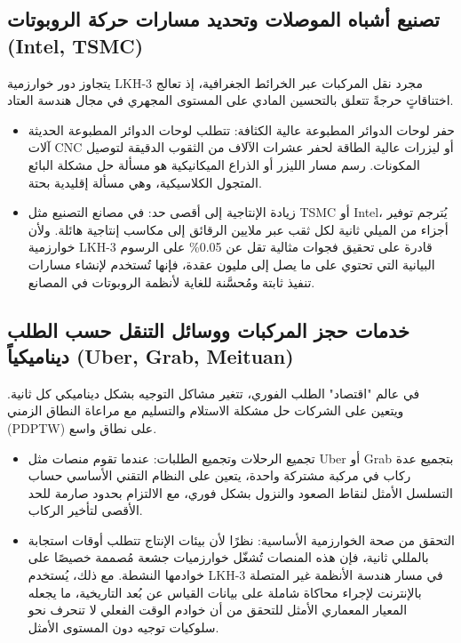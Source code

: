 \documentclass{article}
\newcommand{\en}[1]{\textenglish{#1}}
\begin{document}
\subsection{تصنيع أشباه الموصلات وتحديد مسارات حركة الروبوتات (\en{Intel, TSMC})}
يتجاوز دور خوارزمية \en{LKH-3} مجرد نقل المركبات عبر الخرائط الجغرافية، إذ تعالج اختناقاتٍ حرجةً تتعلق بالتحسين المادي على المستوى المجهري في مجال هندسة العتاد.

\begin{itemize}
	\item
	حفر لوحات الدوائر المطبوعة عالية الكثافة: تتطلب لوحات الدوائر المطبوعة الحديثة آلات \en{CNC} أو ليزرات عالية الطاقة لحفر عشرات الآلاف من الثقوب الدقيقة لتوصيل المكونات. رسم مسار الليزر أو الذراع الميكانيكية هو مسألة حل مشكلة البائع المتجول الكلاسيكية، وهي مسألة إقليدية بحتة.

	\item
	زيادة الإنتاجية إلى أقصى حد: في مصانع التصنيع مثل \en{TSMC} أو \en{Intel}، يُترجم توفير أجزاء من الميلي ثانية لكل ثقب عبر ملايين الرقائق إلى مكاسب إنتاجية هائلة. ولأن خوارزمية \en{LKH-3} قادرة على تحقيق فجوات مثالية تقل عن 0.05\% على الرسوم البيانية التي تحتوي على ما يصل إلى مليون عقدة، فإنها تُستخدم لإنشاء مسارات تنفيذ ثابتة ومُحسَّنة للغاية لأنظمة الروبوتات في المصانع.
\end{itemize}

\subsection{خدمات حجز المركبات ووسائل التنقل حسب الطلب ديناميكياً (\en{Uber, Grab, Meituan})}
في عالم "اقتصاد" الطلب الفوري، تتغير مشاكل التوجيه بشكل ديناميكي كل ثانية. ويتعين على الشركات حل مشكلة الاستلام والتسليم مع مراعاة النطاق الزمني (\en{PDPTW}) على نطاق واسع.

\begin{itemize}
	\item
	تجميع الرحلات وتجميع الطلبات: عندما تقوم منصات مثل \en{Uber} أو \en{Grab} بتجميع عدة ركاب في مركبة مشتركة واحدة، يتعين على النظام التقني الأساسي حساب التسلسل الأمثل لنقاط الصعود والنزول بشكل فوري، مع الالتزام بحدود صارمة للحد الأقصى لتأخير الركاب.

	\item
	التحقق من صحة الخوارزمية الأساسية: نظرًا لأن بيئات الإنتاج تتطلب أوقات استجابة بالمللي ثانية، فإن هذه المنصات تُشغّل خوارزميات جشعة مُصممة خصيصًا على خوادمها النشطة. مع ذلك، يُستخدم \en{LKH-3} في مسار هندسة الأنظمة غير المتصلة بالإنترنت لإجراء محاكاة شاملة على بيانات القياس عن بُعد التاريخية، ما يجعله المعيار المعماري الأمثل للتحقق من أن خوادم الوقت الفعلي لا تنحرف نحو سلوكيات توجيه دون المستوى الأمثل.
\end{itemize}
\end{document}
